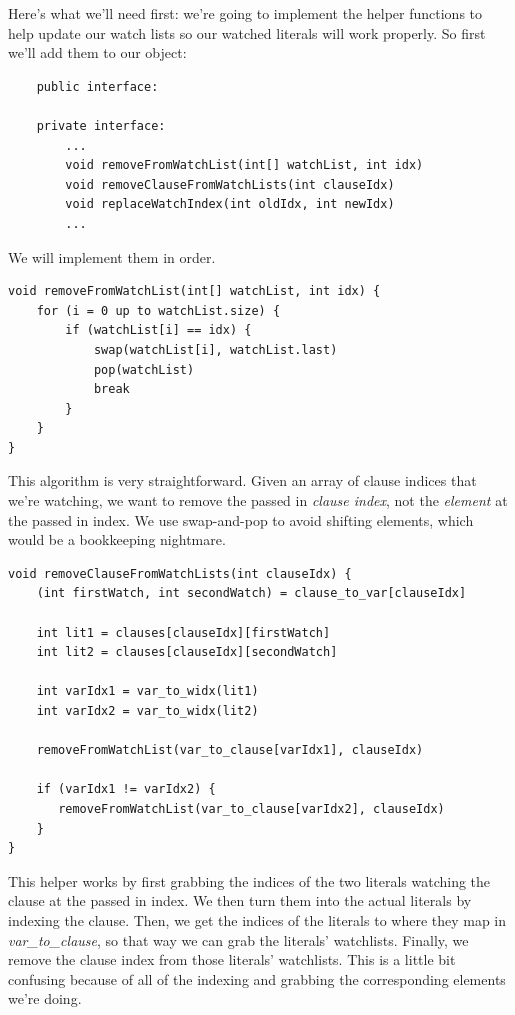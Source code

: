 \documentclass[oneside]{book}
\begin{document}
Here's what we'll need first: we're going to implement the helper functions to help update 
our watch lists so our watched literals will work properly. So first we'll add them to our 
object:

\begin{lstlisting}
    public interface:

    private interface:
        ...
        void removeFromWatchList(int[] watchList, int idx)
        void removeClauseFromWatchLists(int clauseIdx)
        void replaceWatchIndex(int oldIdx, int newIdx)
        ...
\end{lstlisting}
\noindent
We will implement them in order.

\begin{lstlisting}
void removeFromWatchList(int[] watchList, int idx) {
    for (i = 0 up to watchList.size) {
        if (watchList[i] == idx) {
            swap(watchList[i], watchList.last)
            pop(watchList)
            break
        }
    }
}
\end{lstlisting}
This algorithm is very straightforward. Given an array of clause indices that 
we're watching, we want to remove the passed in \textit{clause index}, not 
the \textit{element} at the passed in index. We use swap-and-pop to avoid 
shifting elements, which would be a bookkeeping nightmare.

\begin{lstlisting}
void removeClauseFromWatchLists(int clauseIdx) {
    (int firstWatch, int secondWatch) = clause_to_var[clauseIdx]

    int lit1 = clauses[clauseIdx][firstWatch]
    int lit2 = clauses[clauseIdx][secondWatch]

    int varIdx1 = var_to_widx(lit1)
    int varIdx2 = var_to_widx(lit2)

    removeFromWatchList(var_to_clause[varIdx1], clauseIdx)

    if (varIdx1 != varIdx2) {
       removeFromWatchList(var_to_clause[varIdx2], clauseIdx)
    }
}
\end{lstlisting}
\noindent
This helper works by first grabbing the indices of the two literals watching 
the clause at the passed in index. We then turn them into the actual literals 
by indexing the clause. Then, we get the indices of the literals to where they 
map in \textit{var\_to\_clause}, so that way we can grab the literals' watchlists.
Finally, we remove the clause index from those literals' watchlists. This is a 
little bit confusing because of all of the indexing and grabbing the corresponding 
elements we're doing. 
\end{document}
